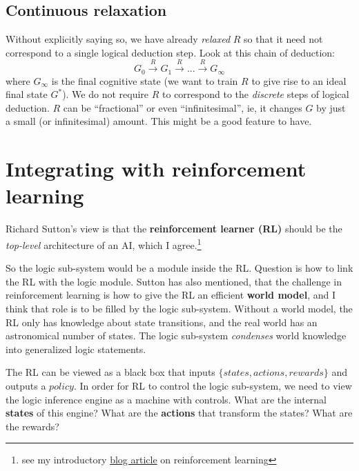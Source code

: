 \documentclass[12pt]{article}
\begin{document}
\subsection{Continuous relaxation}

Without explicitly saying so, we have already \textit{relaxed} $R$ so that it need not correspond to a single logical deduction step.  Look at this chain of deduction:
$$ G_0 \stackrel{R}{\longrightarrow} G_1 \stackrel{R}{\longrightarrow} ... \stackrel{R}{\longrightarrow} G_\infty $$
where $G_\infty$ is the final cognitive state (we want to train $R$ to give rise to an ideal final state $G^*$).  We do not require $R$ to correspond to the \textit{discrete} steps of logical deduction.  $R$ can be ``fractional'' or even ``infinitesimal'', ie, it changes $G$ by just a small (or infinitesimal) amount.  This might be a good feature to have.

\section{Integrating with reinforcement learning}

Richard Sutton's view is that the \textbf{reinforcement learner (RL)} should be the \textit{top-level} architecture of an AI, which I agree.\footnote{see my introductory \href{http://geniferology.blogspot.hk/2015/05/what-is-reinforcement-learning.html}{blog article} on reinforcement learning}

So the logic sub-system would be a module inside the RL.  Question is how to link the RL with the logic module.  Sutton has also mentioned, that the challenge in reinforcement learning is how to give the RL an efficient \textbf{world model}, and I think that role is to be filled by the logic sub-system.  Without a world model, the RL only has knowledge about state transitions, and the real world has an astronomical number of states.  The logic sub-system \textit{condenses} world knowledge into generalized logic statements.

The RL can be viewed as a black box that inputs $\{ states, actions, rewards \}$ and outputs a $policy$.  In order for RL to control the logic sub-system, we need to view the logic inference engine as a machine with controls.  What are the internal \textbf{states} of this engine?  What are the \textbf{actions} that transform the states?  What are the rewards?
\end{document}

